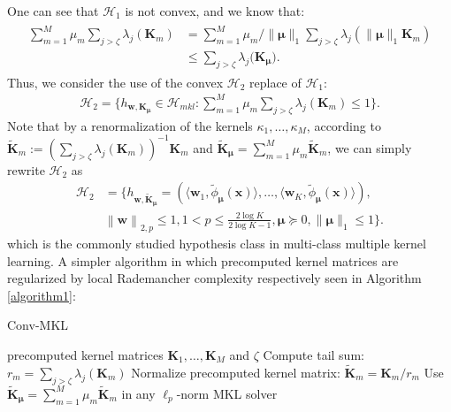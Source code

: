 \documentclass{article}
\begin{document}
One can see that $\mathcal{H}_{1}$ is not convex, and we know that:
\begin{align*}
    \begin{aligned}
        \sum_{m=1}^M\mu_m\sum_{j>\zeta}\lambda_{j}(\mathbf{K}_m)
        & =\sum_{m=1}^M\mu_m/\|\bm \mu\|_1 \sum_{j>\zeta}\lambda_{j}(\|\bm \mu\|_1\mathbf{K}_m)\\
        & \leq \sum_{j>\zeta} \lambda_j\big(\mathbf{K}_{\bm \mu}\big).
    \end{aligned}
\end{align*}
Thus, we consider the use of the convex $\mathcal{H}_2$ replace of $\mathcal{H}_1$:
\begin{align}
    \mathcal{H}_{2}=\Big\{h_{\mathbf{w}, \mathbf{K}_{\bm \mu}} \in \mathcal{H}_{mkl}:
    \sum_{m=1}^M\mu_m\sum_{j>\zeta}\lambda_{j}(\mathbf{K}_m) \leq 1\Big\}.
\end{align}
Note that by a renormalization of the kernels $\kappa_1,\ldots,\kappa_M$,
according to $\tilde{\mathbf K}_m:=\left(\sum_{j>\zeta}\lambda_j(\mathbf K_m)\right)^{-1}\mathbf K_m$
and $\tilde{\mathbf K}_{\bm \mu}=\sum_{m=1}^M\mu_m\tilde{\mathbf K}_m$,
we can simply rewrite $\mathcal{H}_2$ as
\begin{align*}
   \mathcal{H}_2&=\Big\{h_{\mathbf{w},\tilde{\mathbf{K}}_{\bm \mu}}=\left(\langle \mathbf w_1,\tilde{\phi}_{\bm \mu}(\mathbf x)\rangle,
   \ldots, \langle\mathbf w_K,\tilde{\phi}_{\bm \mu}(\mathbf x)\rangle\right),\\
   &\left\|\mathbf  w \right\|_{2,p}\leq 1, 1 < p \leq \frac{2\log K}{2\log K-1},
   \bm \mu\succeq 0,\|\bm \mu\|_1 \leq 1\Big\}.
\end{align*}
which is the commonly studied hypothesis class in multi-class multiple kernel learning.
A simpler algorithm in which precomputed kernel matrices
are regularized by local Rademancher complexity respectively seen in Algorithm  \ref{algorithm1}:
\begin{algorithm}[h]
   \caption{Conv-MKL}
   \label{algorithm1}
    \begin{algorithmic}
        precomputed kernel matrices $\mathbf{K}_1,\ldots,\mathbf{K}_M$ and $\zeta$
        \STATE Compute tail sum: $r_m=\sum_{j>\zeta}\lambda_j\left(\mathbf{K}_m\right)$
        \STATE Normalize precomputed kernel matrix: $\widetilde{\mathbf{K}}_m=\mathbf{K}_m/r_m$
       \ENDFOR
       \STATE Use $\widetilde{\mathbf{K}}_{\bm \mu}=\sum_{m=1}^M \mu_m \widetilde{\mathbf{K}}_m$ in any $\ell_p$-norm MKL solver
    \end{algorithmic}
\end{algorithm}
\end{document}
